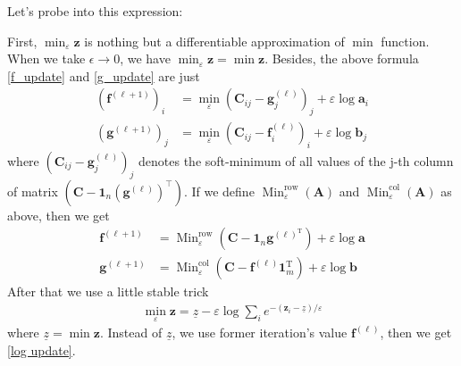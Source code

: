 \documentclass{article}
\begin{document}
Let's probe into this expression:

First, $\min _ { \varepsilon } \mathbf { z } $ is nothing but a differentiable approximation of $\min$ function. When we take $\epsilon \to 0$, we have $ \min _ { \varepsilon } \mathbf { z } = \min \mathbf{z}$. Besides, the above formula \ref{f_update} and \ref{g_update} are just
\begin{align}
\left( \mathbf { f } ^ { ( \ell + 1 ) } \right) _ { i } &= \min _ { \varepsilon } \left( \mathbf { C } _ { i j } - \mathbf { g } _ { j } ^ { ( \ell ) } \right) _ { j } + \varepsilon \log \mathbf { a } _ { i }\\
\left( \mathbf { g } ^ { ( \ell + 1 ) } \right) _ { j } &= \min _ { \varepsilon } \left( \mathbf { C } _ { i j } - \mathbf { f } _ { i } ^ { ( \ell ) } \right) _ { i } + \varepsilon \log \mathbf { b } _ { j }
\end{align}
where $\left( \mathbf { C } _ { i j } - \mathbf { g } _ { j } ^ { ( \ell ) } \right) _ { j }$ denotes the soft-minimum of all values of the j-th column of matrix $\left( \mathbf { C } - \mathbf { 1 } _ { n } \left( \mathbf { g } ^ { ( \ell ) } \right) ^ { \top } \right)$. If we define $ \operatorname { Min } _ { \varepsilon } ^ { \mathrm { row } } ( \mathbf { A } ) $ and $ \operatorname { Min } _ { \varepsilon } ^ { \mathrm { col } } ( \mathbf { A } ) $ as above, then we get
\begin{align}
\mathbf { f } ^ { ( \ell + 1 ) } &= \operatorname { Min } _ { \varepsilon } ^ { \mathrm { row } } \left( \mathbf { C } - \mathbf { 1 } _ { n } \mathbf { g } ^ { ( \ell ) ^ { \mathrm { T } } } \right) + \varepsilon \log \mathbf { a }\\
\mathbf { g } ^ { ( \ell + 1 ) } &= \operatorname { Min } _ { \varepsilon } ^ { \mathrm { col } } \left( \mathbf { C } - \mathbf { f } ^ { ( \ell ) } \mathbf { 1 } _ { m } ^ { \mathrm { T } } \right) + \varepsilon \log \mathbf { b }
\end{align}
After that we use a little stable trick
\begin{align}
\min _ { \varepsilon } \mathbf { z } = \underline { z } - \varepsilon \log \sum _ { i } e ^ { - \left( \mathbf { z } _ { i } - \underline { z } \right) / \varepsilon }
\end{align}
where $\underline{z} = \min \mathbf{z}$. Instead of $\underline{z}$, we use former iteration's value $\mathbf { f } ^ { ( \ell ) }$, then we get \ref{log update}.
\end{document}
